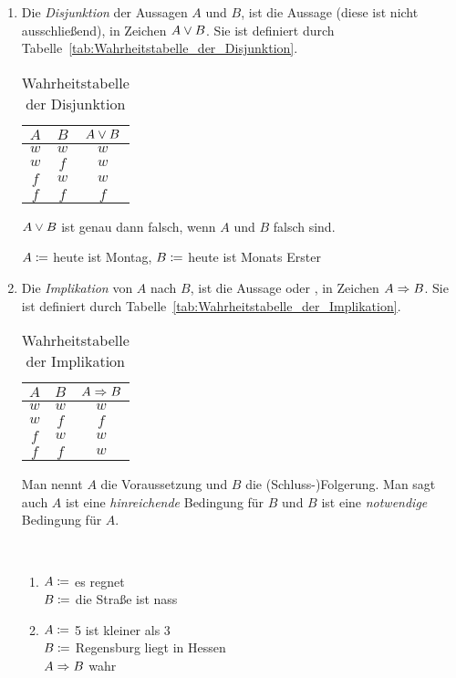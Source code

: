 \begin{definition}
\begin{enumerate}
\item Die \emph{Disjunktion} der Aussagen $A$ und $B$, ist die Aussage  (diese  ist nicht ausschließend), in Zeichen $A \vee B$. Sie ist definiert durch Tabelle~\vref{tab:Wahrheitstabelle_der_Disjunktion}.
	\begin{table}[htb]
	\center
	\begin{tabular}{c|c||c}
	$A$ & $B$ & $A \vee B$\\\hline
	$w$ & $w$ & $w$\\
	$w$ & $f$ & $w$\\
	$f$ & $w$ & $w$\\
	$f$ & $f$ & $f$\\
	\end{tabular}
	\caption{Wahrheitstabelle der Disjunktion}
	\label{tab:Wahrheitstabelle_der_Disjunktion}
	\end{table}
	$A \vee B$ ist genau dann falsch, wenn $A$ und $B$ falsch sind.

	\begin{example}
	$A \mathrel{\mathop:\!\!=}$ heute ist Montag, $B \mathrel{\mathop:\!\!=}$ heute ist Monats Erster
	\end{example}

\item Die \emph{Implikation} von $A$ nach $B$, ist die Aussage  oder , in Zeichen $A \Rightarrow B$. Sie ist definiert durch Tabelle~\vref{tab:Wahrheitstabelle_der_Implikation}.
	\begin{table}[htb]
	\center
	\begin{tabular}{c|c||c}
	$A$ & $B$ & $A \Rightarrow B$\\\hline
	$w$ & $w$ & $w$\\
	$w$ & $f$ & $f$\\
	$f$ & $w$ & $w$\\
	$f$ & $f$ & $w$\\
	\end{tabular}
	\caption{Wahrheitstabelle der Implikation}
	\label{tab:Wahrheitstabelle_der_Implikation}
	\end{table}
	Man nennt $A$ die Voraussetzung und $B$ die (Schluss-)Folgerung. Man sagt auch $A$ ist eine \emph{hinreichende} Bedingung für $B$ und $B$ ist eine \emph{notwendige} Bedingung für $A$.

	\begin{example}~
	\begin{enumerate}
	\item $A \mathrel{\mathop:\!\!=}$ es regnet\\$B \mathrel{\mathop:\!\!=}$ die Straße ist nass
	\item $A \mathrel{\mathop:\!\!=}$ 5 ist kleiner als 3\\$B \mathrel{\mathop:\!\!=}$ Regensburg liegt in Hessen\\$A \Rightarrow B$ wahr
	\end{enumerate}
	\end{example}


\end{enumerate}
\end{definition}
